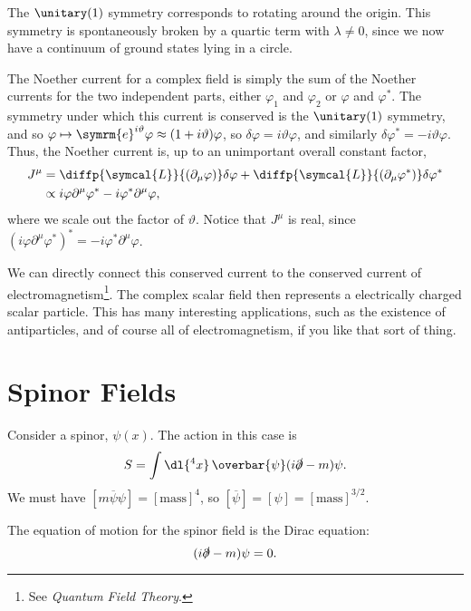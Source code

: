 \documentclass[fleqn]{NotesClass}
\newcommand{\course}[1]{\textit{#1}}
\newcommand{\e}{\symrm{e}}
\newcommand{\diracadjoint}[1]{\overbar{#1}}
\newcommand{\lagrangianDensity}{\symcal{L}}
\begin{document}
    The \(\unitary(1)\) symmetry corresponds to rotating around the origin.
    This symmetry is spontaneously broken by a quartic term with \(\lambda \ne 0\), since we now have a continuum of ground states lying in a circle.
    
    The Noether current for a complex field is simply the sum of the Noether currents for the two independent parts, either \(\varphi_1\) and \(\varphi_2\) or \(\varphi\) and \(\varphi^*\).
    The symmetry under which this current is conserved is the \(\unitary(1)\) symmetry, and so \(\varphi \mapsto \e^{i\vartheta}\varphi \approx (1 + i\vartheta)\varphi\), so \(\delta\varphi = i\vartheta \varphi\), and similarly \(\delta\varphi^* = -i\vartheta\varphi\).
    Thus, the Noether current is, up to an unimportant overall constant factor,
    \begin{align}
        J^\mu &= \diffp{\lagrangianDensity}{(\partial_\mu \varphi)} \delta\varphi + \diffp{\lagrangianDensity}{(\partial_\mu\varphi^*)}\delta\varphi^*\\
        &\propto i\varphi\partial^\mu \varphi^* - i\varphi^*\partial^\mu \varphi,
    \end{align}
    where we scale out the factor of \(\vartheta\).
    Notice that \(J^\mu\) is real, since \((i\varphi\partial^\mu \varphi^*)^* = -i\varphi^*\partial^\mu\varphi\).
    
    We can directly connect this conserved current to the conserved current of electromagnetism\footnote{See \course{Quantum Field Theory}.}.
    The complex scalar field then represents a electrically charged scalar particle.
    This has many interesting applications, such as the existence of antiparticles, and of course all of electromagnetism, if you like that sort of thing.
    
    \section{Spinor Fields}
    Consider a spinor, \(\psi(x)\).
    The action in this case is
    \begin{equation}
        S = \int \dl{^4x} \, \diracadjoint{\psi}(i\slashed{\partial} - m)\psi.
    \end{equation}
    We must have \([m\diracadjoint{\psi}\psi] = [\text{mass}]^4\), so \([\diracadjoint{\psi}] = [\psi] = [\text{mass}]^{3/2}\).
    
    The equation of motion for the spinor field is the Dirac equation:
    \begin{equation}
        (i\slashed{\partial} - m)\psi = 0.
    \end{equation}
    
\end{document}
